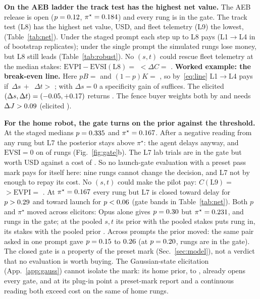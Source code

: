 \documentclass{article}
\newcommand{\evsi}{\mathrm{EVSI}}
\newcommand{\evpi}{\mathrm{EVPI}}
\newcommand{\pist}{\pi^\star}
\newcommand{\step}[2]{L#1$\to$L#2}
\begin{document}
\textbf{On the AEB ladder the track test has the highest net value.}\label{sec:aeb} The AEB release is open ($p=0.12$, $\pist=\twAebPiStar$) and every rung is in the gate. The track test (L8) has the highest net value, \twAebNetLEight{} USD, and fleet telemetry (L9) the lowest, \twAebNetLNine{} (Table~\ref{tab:net}). Under the staged prompt each step up to L8 pays (\step{1}{4} in \twStepOneFourPays{} of bootstrap replicates); under the single prompt the simulated rungs lose money, but L8 still leads (Table~\ref{tab:robust}). No $(s,t)$ could rescue fleet telemetry at the median stakes: $\evpi-\evsi(\mathrm{L8})=$ \twAebHeadroom{} $<\Delta C=$ \twStepEightNinedC.
\textbf{Worked example: the break-even line.} Here $pB=$ \twAebpB{} and $(1-p)K=$ \twAebqK, so by~\eqref{eq:line} \step{1}{4} pays if \twAebpB$\,\Delta s\,+$ \twAebqK$\,\Delta t>$ \twStepOneFourdC; with $\Delta s=0$ a specificity gain of \twStepOneFourdTBE{} suffices. The elicited $(\Delta s,\Delta t)=(-0.05,+0.17)$ returns \twStepOneFourdEVSI. The fence buyer weights both by \twAebLamVar{} and needs $\Delta J>0.09$ (elicited \twDJAebOneFour).

\textbf{For the home robot, the gate turns on the prior against the threshold.}\label{sec:home} At the staged medians $p=0.335$ and $\pist=\twHomePiStar$. After a negative reading from any rung but L7 the posterior stays above $\pist$: the agent delays anyway, and $\evsi=0$ on \twHomeAlwaysN{} of \twNHome{} rungs (Fig.~\ref{fig:gate}b). The L7 lab trials are in the gate but worth \twLSevenEVSI{} USD against a cost of \twLSevenC. So no launch-gate evaluation with a preset pass mark pays for itself here: nine rungs cannot change the decision, and L7 not by enough to repay its cost. No $(s,t)$ could make the pilot pay: $C(\mathrm{L9})=$ \twHomeCLNine{} $>\evpi=$ \twHomeEVPI.
At $\pist=\twHomePiStar$ every rung but L7 is closed toward delay for $p>0.29$ and toward launch for $p<0.06$ (gate bands in Table~\ref{tab:net}). Both $p$ and $\pist$ moved across elicitors: Opus alone gives $p=0.30$ but $\pist=\twOpusHomePiStar$, and \twOpusHomeGate{} rungs in the gate; at the pooled $s,t$ its prior with the pooled stakes puts \twOpusPriorOnlyGate{} rung in, its stakes with the pooled prior \twOpusStakesOnlyGate. Across prompts the prior moved: the same pair asked in one prompt gave $p=0.15$ to $0.26$ (at $p=0.20$, \twCfGate{} rungs are in the gate).
The closed gate is a property of the preset mark (Sec.~\ref{sec:model}), not a verdict that no evaluation is worth buying. The Gaussian-state elicitation (App.~\ref{app:gauss}) cannot isolate the mark: its home prior, \twGaussHomePLo{} to \twGaussHomePHi, already opens every gate, and at its plug-in point a preset-mark report and a continuous reading both exceed cost on the same \twGaussHomeStepfixPlug{} of \twNHome{} home rungs.
\end{document}
